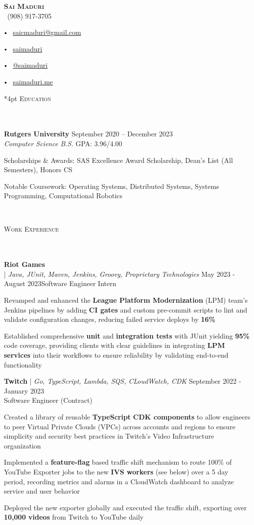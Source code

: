 \documentclass[letterpaper,10pt]{article}
\newcommand{\contact}[3]{
\vspace*{3pt}
\begin{center}
{\LARGE \scshape {#1}}\\
\vspace{5pt}
#2 
\vspace{2pt}
#3
\end{center}
\vspace*{-8pt}
}
\newcommand{\header}[1]{{
\hspace*{0pt}\vspace*{6pt} \textsc{#1}} \vspace*{-6pt} 
\lineunder
}
\newcommand{\lineunder}{
\vspace*{-8pt} \\ \hspace*{-3pt} 
\hrulefill \\
}
\newcommand{\college}[7]{
\textbf{#1} \textbf{#2} \hfill #3 \\ #4 \hfill #7 \\ #5 \\ #6 \vspace*{5pt}
}
\newcommand{\employer}[4]{{
\vspace*{2pt}%
\textbf{#1} #2 \hfill #3\\ #4 \vspace*{2pt}}
}
\renewcommand{\labelitemi}{
$\vcenter{\hbox{\tiny$\bullet$}}$\hspace*{3pt}
}
\renewcommand{\labelitemii}{
$\vcenter{\hbox{\tiny$\bullet$}}$\hspace*{-3pt}
}
\newenvironment{bullet-list-minor}{
\begin{list}{\labelitemii}{\setlength\leftmargin{15pt} 
\topsep 0pt \itemsep -2pt}}{\vspace*{4pt}\end{list}
}
\begin{document}
\small
\smallskip
\vspace*{-44pt}

\contact{\textbf{Sai Maduri}}
{\faPhone\ (908) 917-3705
\labelitemi \faEnvelope\ \href{mailto:saicmaduri@gmail.com}{saicmaduri@gmail.com}
\labelitemi \faLinkedin\ \href{https://www.linkedin.com/in/saimaduri/}{saimaduri}
\labelitemi \faGithub\ \href{https://github.com/saimaduri}{@saimaduri}%
\labelitemi \faLink\ \href{https://saimaduri.me}{saimaduri.me}}

\vspace*{4pt}%
\header{Education}
    \college{Rutgers University}{}{September 2020 -- December 2023}
    {\textit{Computer Science B.S.}}
    {\begin{bullet-list-minor}
        \item Scholarships \& Awards: SAS Excellence Award Scholarship, Dean's List (All Semesters), Honors CS
        \item Notable Coursework: Operating Systems, Distributed Systems, Systems Programming, Computational Robotics
    \end{bullet-list-minor}}{} 
    {GPA: 3.96/4.00}
    
\vspace*{0pt}%
\header{Work Experience}
    \employer{Riot Games}
\textbf{}    {| \textit{Java, JUnit, Maven, Jenkins, Groovy, Proprietary Technologies}}{May 2023 - August 2023}{Software Engineer Intern}
    \begin{bullet-list-minor}
    \item Revamped and enhanced the \textbf{League Platform Modernization} (LPM) team's Jenkins pipelines by adding \textbf{CI gates} and custom pre-commit scripts to lint and validate configuration changes, reducing failed service deploys by \textbf{16\%} 
    \item Established comprehensive \textbf{unit} and \textbf{integration tests} with JUnit yielding \textbf{95\%} code coverage, providing clients with clear guidelines in integrating \textbf{LPM services} into their workflows to ensure reliability by validating end-to-end functionality
    \end{bullet-list-minor}
    
    \employer{Twitch}
    {| \textit{Go, TypeScript, Lambda, SQS, CLoudWatch, CDK}}{September 2022 - January 2023}{Software Engineer (Contract)}
    \begin{bullet-list-minor}
    \item Created a library of reusable \textbf{TypeScript} \textbf{CDK components} to allow engineers to peer Virtual Private Clouds (VPCs) across accounts and regions to ensure simplicity and security best practices in Twitch's Video Infrastructure organization
    \item Implemented a \textbf{feature-flag} based traffic shift mechanism to route 100\% of YouTube Exporter jobs to the new \textbf{IVS workers} (see below) over a 5 day period, recording metrics and alarms in a CloudWatch dashboard to analyze service and user behavior
    \item Deployed the new exporter globally and executed the traffic shift, exporting over \textbf{10,000 videos} from Twitch to YouTube daily 
    \end{bullet-list-minor}
    
\end{document}
